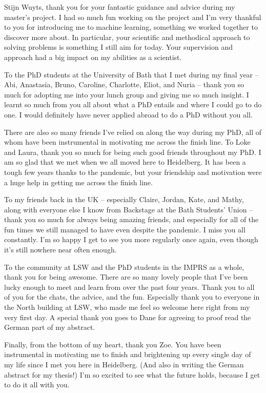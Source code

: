 Stijn Wuyts, thank you for your fantastic guidance and advice during my master's project. I had so much fun working on the project and I'm very thankful to you for introducing me to machine learning, something we worked together to discover more about. In particular, your scientific and methodical approach to solving problems is something I still aim for today. Your supervision and approach had a big impact on my abilities as a scientist.

To the PhD students at the University of Bath that I met during my final year -- Abi, Anastasia, Bruno, Caroline, Charlotte, Eliot, and Nuria -- thank you so much for adopting me into your lunch group and giving me so much insight. I learnt so much from you all about what a PhD entails and where I could go to do one. I would definitely have never applied abroad to do a PhD without you all.

There are also so many friends I've relied on along the way during my PhD, all of whom have been instrumental in motivating me across the finish line. To Loke and Laura, thank you so much for being such good friends throughout my PhD. I am so glad that we met when we all moved here to Heidelberg. It has been a tough few years thanks to the pandemic, but your friendship and motivation were a huge help in getting me across the finish line.

To my friends back in the UK -- especially Claire, Jordan, Kate, and Mathy, along with everyone else I know from Backstage at the Bath Students' Union -- thank you so much for always being amazing friends, and especially for all of the fun times we still managed to have even despite the pandemic. I miss you all constantly. I'm so happy I get to see you more regularly once again, even though it's still nowhere near often enough.

To the community at LSW and the PhD students in the IMPRS as a whole, thank you for being awesome. There are so many lovely people that I've been lucky enough to meet and learn from over the past four years. Thank you to all of you for the chats, the advice, and the fun. Especially thank you to everyone in the North building at LSW, who made me feel so welcome here right from my very first day. A special thank you goes to Dane for agreeing to proof read the German part of my abstract.

Finally, from the bottom of my heart, thank you Zoe. You have been instrumental in motivating me to finish and brightening up every single day of my life since I met you here in Heidelberg. (And also in writing the German abstract for my thesis!) I'm so excited to see what the future holds, because I get to do it all with you.
